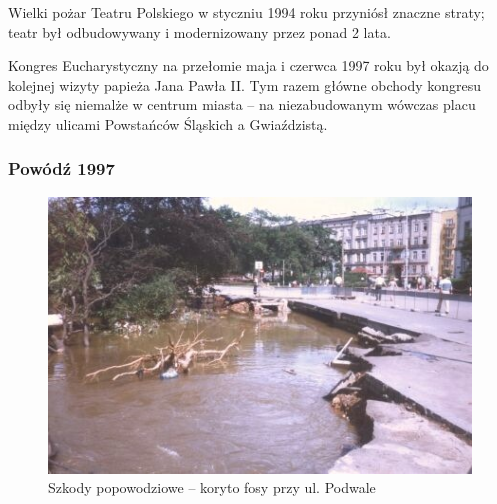 \documentclass{article}
\begin{document}
Wielki pożar Teatru Polskiego w styczniu 1994 roku przyniósł znaczne straty; teatr był odbudowywany i modernizowany przez ponad 2 lata.

Kongres Eucharystyczny na przełomie maja i czerwca 1997 roku był okazją do kolejnej wizyty papieża Jana Pawła II. Tym razem główne obchody kongresu odbyły się niemalże w centrum miasta – na niezabudowanym wówczas placu między ulicami Powstańców Śląskich a Gwiaździstą.
\subsubsection{Powódź 1997}
\begin{figure}[h!]
\centering
\includegraphics[scale=3]{Obrazy/Wrocław powódź.jpg}
\caption{Szkody popowodziowe – koryto fosy przy ul. Podwale}
\label{fig:powodz}
\end{figure}
\end{document}
